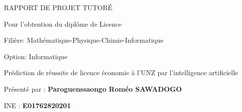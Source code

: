 \begin{titlepage}
\begin{center}
\vspace{20pt}

{\fontsize{18}{1}\selectfont RAPPORT DE PROJET TUTORÉ}

\vspace{15pt}

\begin{tcolorbox}[
    enhanced,
    colback={rgb:red,10;green,132;blue,225}, %
    colframe={rgb:red,10;green,132;blue,225}, %
    fontupper=\large\color{white}, %
    arc=0pt, %
    coltext=white, %
    center, %
]
\begin{center}
Pour l’obtention du diplôme de Licence
\end{center}
\end{tcolorbox}

\vspace{20pt}

{\fontsize{14}{1}\selectfont Filière: Mathématique-Physique-Chimie-Informatique}

\vspace{15pt}

{\fontsize{14}{1}\selectfont Option: Informatique}

\vspace{20pt}

\begin{tcolorbox}[
    enhanced,
    colback=gray!20, %
    colframe=black, %
    rounded corners, %
    fontupper=\fontsize{20}{24}\selectfont\bfseries, %
    drop shadow %
]
\begin{center}
Prédiction de réussite de licence économie à l'UNZ par l'intelligence artificielle \\ 

\end{center}
\end{tcolorbox}

\vspace{30pt}

{\fontsize{16}{1}\selectfont Présenté par : \textbf{Paroguenssaongo Roméo SAWADOGO}}

\vspace{10pt}
{\fontsize{16}{1}\selectfont INE : \textbf{E01762820201}}


\end{center}
\end{titlepage}
